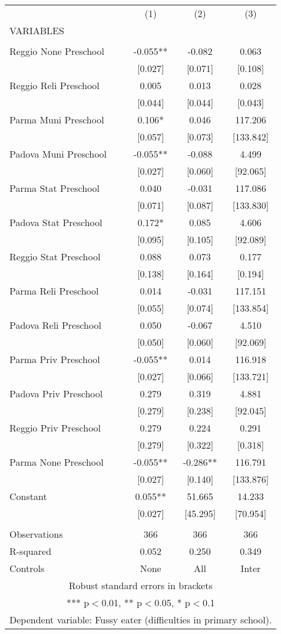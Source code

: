 \begin{tabular}{lccc} \hline
 & (1) & (2) & (3) \\
VARIABLES &  &  &  \\ \hline
 &  &  &  \\
Reggio None Preschool & -0.055** & -0.082 & 0.063 \\
 & [0.027] & [0.071] & [0.108] \\
Reggio Reli Preschool & 0.005 & 0.013 & 0.028 \\
 & [0.044] & [0.044] & [0.043] \\
Parma Muni Preschool & 0.106* & 0.046 & 117.206 \\
 & [0.057] & [0.073] & [133.842] \\
Padova Muni Preschool & -0.055** & -0.088 & 4.499 \\
 & [0.027] & [0.060] & [92.065] \\
Parma Stat Preschool & 0.040 & -0.031 & 117.086 \\
 & [0.071] & [0.087] & [133.830] \\
Padova Stat Preschool & 0.172* & 0.085 & 4.606 \\
 & [0.095] & [0.105] & [92.089] \\
Reggio Stat Preschool & 0.088 & 0.073 & 0.177 \\
 & [0.138] & [0.164] & [0.194] \\
Parma Reli Preschool & 0.014 & -0.031 & 117.151 \\
 & [0.055] & [0.074] & [133.854] \\
Padova Reli Preschool & 0.050 & -0.067 & 4.510 \\
 & [0.050] & [0.060] & [92.069] \\
Parma Priv Preschool & -0.055** & 0.014 & 116.918 \\
 & [0.027] & [0.066] & [133.721] \\
Padova Priv Preschool & 0.279 & 0.319 & 4.881 \\
 & [0.279] & [0.238] & [92.045] \\
Reggio Priv Preschool & 0.279 & 0.224 & 0.291 \\
 & [0.279] & [0.322] & [0.318] \\
Parma None Preschool & -0.055** & -0.286** & 116.791 \\
 & [0.027] & [0.140] & [133.876] \\
Constant & 0.055** & 51.665 & 14.233 \\
 & [0.027] & [45.295] & [70.954] \\
 &  &  &  \\
Observations & 366 & 366 & 366 \\
R-squared & 0.052 & 0.250 & 0.349 \\
 Controls & None & All & Inter \\ \hline
\multicolumn{4}{c}{ Robust standard errors in brackets} \\
\multicolumn{4}{c}{ *** p$<$0.01, ** p$<$0.05, * p$<$0.1} \\
\multicolumn{4}{c}{ Dependent variable: Fussy eater (difficulties in primary school).} \\
\end{tabular}
